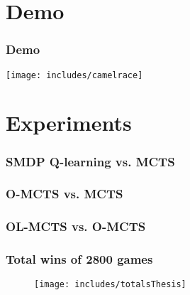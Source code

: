 \documentclass{beamer}
\begin{document}
\section{Demo}
\begin{frame}
	\frametitle{Demo}
	\texttt{[image: includes/camelrace]}
\end{frame}

\section{Experiments}
\begin{frame}
	\frametitle{SMDP Q-learning vs. MCTS}
	\begin{figure}
	\centering
	\end{figure}
	\begin{figure}
	\centering
	\end{figure}
\end{frame}

\begin{frame}
	\frametitle{O-MCTS vs. MCTS}
	\begin{figure}
	\centering
	\end{figure}
	\begin{figure}
	\centering
	\end{figure}
\end{frame}

\begin{frame}
	\frametitle{OL-MCTS vs. O-MCTS}
	\begin{figure}
	\centering
	\end{figure}
	\begin{figure}
	\centering
	\end{figure}
\end{frame}

\begin{frame}
	\frametitle{Total wins of 2800 games}
	\begin{figure}
	\centering
	\texttt{[image: includes/totalsThesis]}
	\end{figure}
\end{frame}
\end{document}

